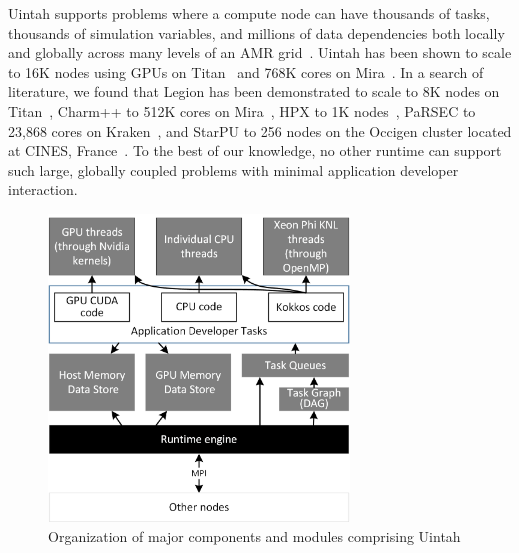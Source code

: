 \documentclass[12pt]{article}
\begin{document}
Uintah supports problems where a compute node can have thousands of tasks, thousands of simulation variables, and millions of data dependencies both locally and globally across many levels of an AMR grid~\cite{espm2-brad}.  Uintah has been shown to scale to 16K nodes using GPUs on Titan~\cite{uintah-2016-titan-scaling} and 768K cores on Mira~\cite{uintah-2016-mira-scaling}.   In a search of literature, we found that Legion has been demonstrated to scale to 8K nodes on Titan~\cite{legion-2014-thesis-scaling}, Charm++ to 512K cores on Mira~\cite{charmpp-2017-scaling}, HPX to 1K nodes~\cite{HPX-scaling-global-address-space}, PaRSEC to 23,868 cores on Kraken~\cite{parsec-2014-scaling}, and StarPU to 256 nodes on the Occigen cluster located at CINES, France~\cite{starpu-2016-scaling}.  To the best of our knowledge, no other runtime can support such large, globally coupled problems with minimal application developer interaction.  

\begin{figure}
	\centering
	\includegraphics[width=8cm]{figures/Uintah_modules_simplified.png}
	\caption{Organization of major components and modules comprising Uintah}
	\label{fig:uintah-structure}
\end{figure}
 
\end{document}
